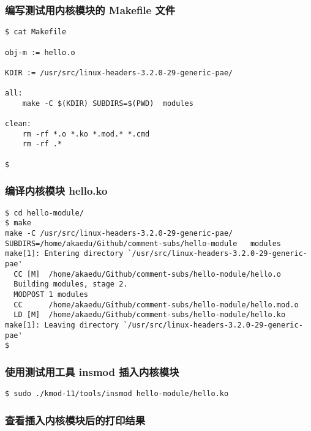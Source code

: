\documentclass[11pt,a4paper]{article}
\begin{document}
\subsubsection{编写测试用内核模块的 Makefile 文件}

{\begin{shaded}\begin{verbatim}
$ cat Makefile 

obj-m := hello.o

KDIR := /usr/src/linux-headers-3.2.0-29-generic-pae/

all:
    make -C $(KDIR) SUBDIRS=$(PWD)  modules

clean:
    rm -rf *.o *.ko *.mod.* *.cmd 
    rm -rf .*

$ 
\end{verbatim}\end{shaded}}
\subsubsection{编译内核模块 hello.ko}

{\begin{shaded}\begin{verbatim}
$ cd hello-module/ 
$ make
make -C /usr/src/linux-headers-3.2.0-29-generic-pae/    SUBDIRS=/home/akaedu/Github/comment-subs/hello-module   modules
make[1]: Entering directory `/usr/src/linux-headers-3.2.0-29-generic-pae'
  CC [M]  /home/akaedu/Github/comment-subs/hello-module/hello.o
  Building modules, stage 2.
  MODPOST 1 modules
  CC      /home/akaedu/Github/comment-subs/hello-module/hello.mod.o
  LD [M]  /home/akaedu/Github/comment-subs/hello-module/hello.ko
make[1]: Leaving directory `/usr/src/linux-headers-3.2.0-29-generic-pae'
$ 
\end{verbatim}\end{shaded}}
\subsubsection{使用测试用工具 insmod 插入内核模块}

{\begin{shaded}\begin{verbatim}
$ sudo ./kmod-11/tools/insmod hello-module/hello.ko 
\end{verbatim}\end{shaded}}
\subsubsection{查看插入内核模块后的打印结果}
\end{document}
